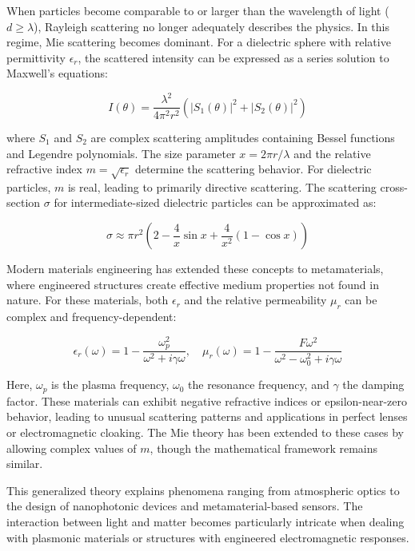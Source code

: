 \documentclass[
  a4paper,
]{book}
\begin{document}
\begin{tcolorbox}[enhanced jigsaw, coltitle=black, title=\textcolor{quarto-callout-note-color}{\faInfo}\hspace{0.5em}{Mie Scattering and Complex Materials}, colframe=quarto-callout-note-color-frame, toprule=.15mm, opacitybacktitle=0.6, left=2mm, opacityback=0, breakable, toptitle=1mm, bottomtitle=1mm, leftrule=.75mm, arc=.35mm, titlerule=0mm, colbacktitle=quarto-callout-note-color!10!white, rightrule=.15mm, bottomrule=.15mm, colback=white]

When particles become comparable to or larger than the wavelength of
light (\(d \geq \lambda\)), Rayleigh scattering no longer adequately
describes the physics. In this regime, Mie scattering becomes dominant.
For a dielectric sphere with relative permittivity \(\epsilon_r\), the
scattered intensity can be expressed as a series solution to Maxwell's
equations:

\[I(\theta) = \frac{\lambda^2}{4\pi^2r^2}(|S_1(\theta)|^2 + |S_2(\theta)|^2)\]

where \(S_1\) and \(S_2\) are complex scattering amplitudes containing
Bessel functions and Legendre polynomials. The size parameter
\(x = 2\pi r/\lambda\) and the relative refractive index
\(m = \sqrt{\epsilon_r}\) determine the scattering behavior. For
dielectric particles, \(m\) is real, leading to primarily directive
scattering. The scattering cross-section \(\sigma\) for
intermediate-sized dielectric particles can be approximated as:

\[\sigma \approx \pi r^2 \left(2 - \frac{4}{x}\sin{x} + \frac{4}{x^2}(1-\cos{x})\right)\]

Modern materials engineering has extended these concepts to
metamaterials, where engineered structures create effective medium
properties not found in nature. For these materials, both \(\epsilon_r\)
and the relative permeability \(\mu_r\) can be complex and
frequency-dependent:

\[\epsilon_r(\omega) = 1 - \frac{\omega_p^2}{\omega^2 + i\gamma\omega}, \quad \mu_r(\omega) = 1 - \frac{F\omega^2}{\omega^2 - \omega_0^2 + i\gamma\omega}\]

Here, \(\omega_p\) is the plasma frequency, \(\omega_0\) the resonance
frequency, and \(\gamma\) the damping factor. These materials can
exhibit negative refractive indices or epsilon-near-zero behavior,
leading to unusual scattering patterns and applications in perfect
lenses or electromagnetic cloaking. The Mie theory has been extended to
these cases by allowing complex values of \(m\), though the mathematical
framework remains similar.

This generalized theory explains phenomena ranging from atmospheric
optics to the design of nanophotonic devices and metamaterial-based
sensors. The interaction between light and matter becomes particularly
intricate when dealing with plasmonic materials or structures with
engineered electromagnetic responses.

\end{tcolorbox}
\end{document}
